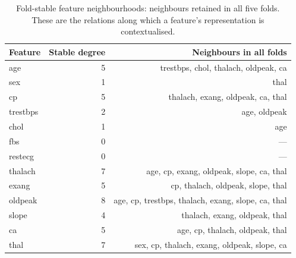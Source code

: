 \begin{table}[t]
\centering
\caption{Fold-stable feature neighbourhoods: neighbours retained in all five folds. These are the relations along which a feature's representation is contextualised.}
\label{tab:neighbourhoods}
\footnotesize
\begin{tabular}{lrr}
\toprule
Feature & Stable degree & Neighbours in all folds \\
\midrule
age & 5 & trestbps, chol, thalach, oldpeak, ca \\
sex & 1 & thal \\
cp & 5 & thalach, exang, oldpeak, ca, thal \\
trestbps & 2 & age, oldpeak \\
chol & 1 & age \\
fbs & 0 & --- \\
restecg & 0 & --- \\
thalach & 7 & age, cp, exang, oldpeak, slope, ca, thal \\
exang & 5 & cp, thalach, oldpeak, slope, thal \\
oldpeak & 8 & age, cp, trestbps, thalach, exang, slope, ca, thal \\
slope & 4 & thalach, exang, oldpeak, thal \\
ca & 5 & age, cp, thalach, oldpeak, thal \\
thal & 7 & sex, cp, thalach, exang, oldpeak, slope, ca \\
\bottomrule
\end{tabular}
\end{table}
